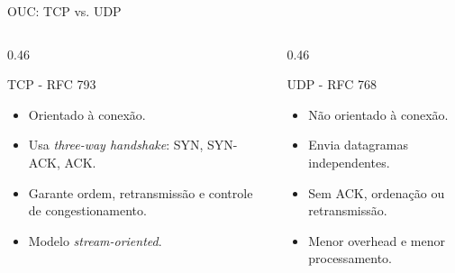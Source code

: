 \documentclass[10pt, aspectratio=169]{beamer}
\begin{document}
\begin{frame}{OUC: TCP vs. UDP}
    \small
    \begin{columns}[T,totalwidth=\textwidth]
        \begin{column}{0.46\textwidth}
            \begin{block}{TCP - RFC 793}
                \begin{itemize}
                    \item Orientado \`a conex\~ao.
                    \item Usa \textit{three-way handshake}: SYN, SYN-ACK, ACK.
                    \item Garante ordem, retransmiss\~ao e controle de congestionamento.
                    \item Modelo \textit{stream-oriented}.
                \end{itemize}
            \end{block}
        \end{column}
        \begin{column}{0.46\textwidth}
            \begin{block}{UDP - RFC 768}
                \begin{itemize}
                    \item N\~ao orientado \`a conex\~ao.
                    \item Envia datagramas independentes.
                    \item Sem ACK, ordena\c{c}\~ao ou retransmiss\~ao.
                    \item Menor overhead e menor processamento.
                \end{itemize}
            \end{block}
        \end{column}
    \end{columns}
\end{frame}
\end{document}
